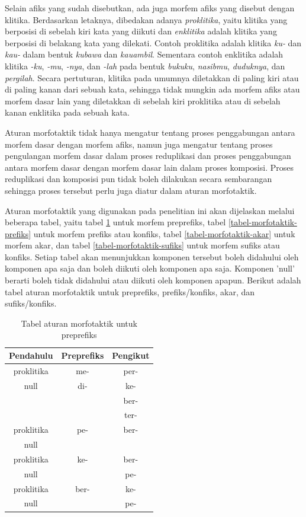 Selain afiks yang sudah disebutkan, ada juga morfem afiks yang disebut dengan klitika. Berdasarkan letaknya, dibedakan adanya \textit{proklitika}, yaitu klitika yang berposisi di sebelah kiri kata yang diikuti dan \textit{enklitika} adalah klitika yang berposisi di belakang kata yang dilekati. Contoh proklitika adalah klitika \textit{ku-} dan \textit{kau-} dalam bentuk \textit{kubawa} dan \textit{kauambil}. Sementara contoh enklitika adalah klitika \textit{-ku}, \textit{-mu}, \textit{-nya}, dan \textit{-lah} pada bentuk \textit{bukuku}, \textit{nasibmu}, \textit{duduknya}, dan \textit{pergilah}. Secara pertuturan, klitika pada umumnya diletakkan di paling kiri atau di paling kanan dari sebuah kata, sehingga tidak mungkin ada morfem afiks atau morfem dasar lain yang diletakkan di sebelah kiri proklitika atau di sebelah kanan enklitika pada sebuah kata.

Aturan morfotaktik tidak hanya mengatur tentang proses penggabungan antara morfem dasar dengan morfem afiks, namun juga mengatur tentang proses pengulangan morfem dasar dalam proses reduplikasi dan proses penggabungan antara morfem dasar dengan morfem dasar lain dalam proses komposisi. Proses reduplikasi dan komposisi pun tidak boleh dilakukan secara sembarangan sehingga proses tersebut perlu juga diatur dalam aturan morfotaktik.

Aturan morfotaktik yang digunakan pada penelitian ini akan dijelaskan melalui beberapa tabel, yaitu tabel \ref{tabel-morfotaktik-preprefiks} untuk morfem preprefiks, tabel \ref{tabel-morfotaktik-prefiks} untuk morfem prefiks atau konfiks, tabel \ref{tabel-morfotaktik-akar} untuk morfem akar, dan tabel \ref{tabel-morfotaktik-sufiks} untuk morfem sufiks atau konfiks. Setiap tabel akan menunjukkan komponen tersebut boleh didahului oleh komponen apa saja dan boleh diikuti oleh komponen apa saja. Komponen 'null' berarti boleh tidak didahului atau diikuti oleh komponen apapun. Berikut adalah tabel aturan morfotaktik untuk preprefiks, prefiks/konfiks, akar, dan sufiks/konfiks.

\begin{table}[H]
\centering
\begin{tabular}{|c|c|c|}
\hline
\textbf{Pendahulu} & \textbf{Preprefiks} & \textbf{Pengikut} \\
\hline
 proklitika&me-&per-\\
 null&di-&ke-\\
 & &ber-\\
 & &ter-\\
 \hline
 proklitika&pe-&ber-\\
 null& & \\
 \hline
 proklitika&ke-&ber-\\
 null& &pe-\\
 \hline
 proklitika&ber-&ke-\\
 null& &pe-\\
\hline
\end{tabular}
\caption{Tabel aturan morfotaktik untuk preprefiks} 
\label{tabel-morfotaktik-preprefiks}
\end{table}

